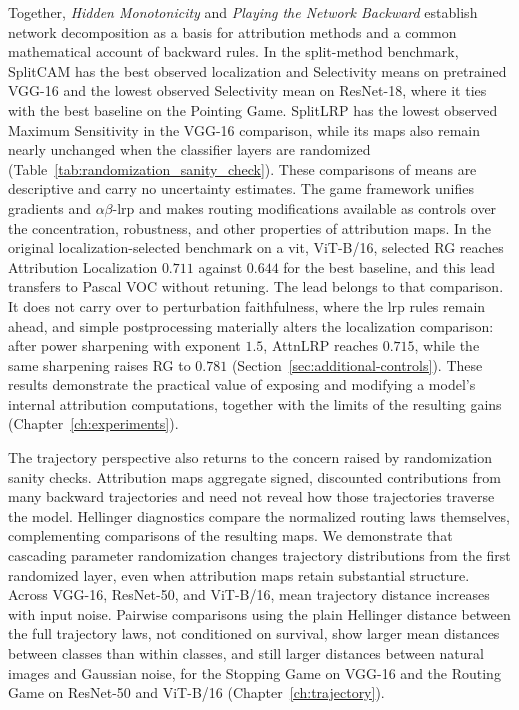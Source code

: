 \begin{changed}
Together, \emph{Hidden Monotonicity} and \emph{Playing the Network Backward} establish network decomposition as a basis for attribution methods and a common mathematical account of backward rules. In the split-method benchmark, SplitCAM has the best observed localization and Selectivity means on pretrained VGG-16 and the lowest observed Selectivity mean on ResNet-18, where it ties with the best baseline on the Pointing Game. SplitLRP has the lowest observed Maximum Sensitivity in the VGG-16 comparison, while its maps also remain nearly unchanged when the classifier layers are randomized (Table~\ref{tab:randomization_sanity_check}). These comparisons of means are descriptive and carry no uncertainty estimates. The game framework unifies gradients and $\alpha\beta$-\ac{lrp} and makes routing modifications available as controls over the concentration, robustness, and other properties of attribution maps. In the original localization-selected benchmark on a \ac{vit}, ViT-B/16, selected RG reaches Attribution Localization $0.711$ against $0.644$ for the best baseline, and this lead transfers to Pascal VOC without retuning. The lead belongs to that comparison. It does not carry over to perturbation faithfulness, where the \ac{lrp} rules remain ahead, and simple postprocessing materially alters the localization comparison: after power sharpening with exponent $1.5$, AttnLRP reaches $0.715$, while the same sharpening raises RG to $0.781$ (Section~\ref{sec:additional-controls}). These results demonstrate the practical value of exposing and modifying a model's internal attribution computations, together with the limits of the resulting gains (Chapter~\ref{ch:experiments}).
\end{changed}

The trajectory perspective also returns to the concern raised by randomization sanity checks. Attribution maps aggregate signed, discounted contributions from many backward trajectories and need not reveal how those trajectories traverse the model. Hellinger diagnostics compare the normalized routing laws themselves, complementing comparisons of the resulting maps. We demonstrate that cascading parameter randomization changes trajectory distributions from the first randomized layer, even when attribution maps retain substantial structure. Across VGG-16, ResNet-50, and ViT-B/16, mean trajectory distance increases with input noise. Pairwise comparisons using the plain Hellinger distance between the full trajectory laws, not conditioned on survival, show larger mean distances between classes than within classes, and still larger distances between natural images and Gaussian noise, for the Stopping Game on VGG-16 and the Routing Game on ResNet-50 and ViT-B/16 (Chapter~\ref{ch:trajectory}).

